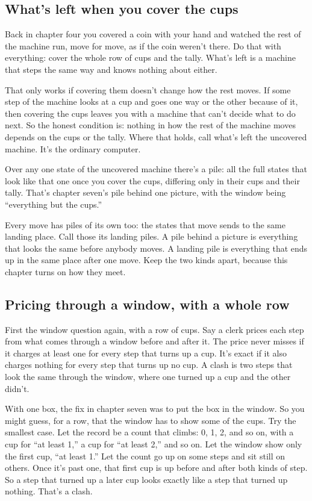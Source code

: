 \documentclass[11pt,twoside]{article}
\theoremstyle{thielethm}
\theoremstyle{thieledef}
\theoremstyle{thieledef}
\theoremstyle{thieledef}
\theoremstyle{thielethm}
\theoremstyle{thieleobs}
\theoremstyle{thielethm}
\begin{document}
\subsection{What's left when you cover the cups}

Back in chapter four you covered a coin with your hand and watched the rest of the machine run, move for move, as if the coin weren't there. Do that with everything: cover the whole row of cups and the tally. What's left is a machine that steps the same way and knows nothing about either.

That only works if covering them doesn't change how the rest moves. If some step of the machine looks at a cup and goes one way or the other because of it, then covering the cups leaves you with a machine that can't decide what to do next. So the honest condition is: nothing in how the rest of the machine moves depends on the cups or the tally. Where that holds, call what's left the uncovered machine. It's the ordinary computer.

Over any one state of the uncovered machine there's a pile: all the full states that look like that one once you cover the cups, differing only in their cups and their tally. That's chapter seven's pile behind one picture, with the window being ``everything but the cups.''

Every move has piles of its own too: the states that move sends to the same landing place. Call those its landing piles. A pile behind a picture is everything that looks the same before anybody moves. A landing pile is everything that ends up in the same place after one move. Keep the two kinds apart, because this chapter turns on how they meet.

\subsection{Pricing through a window, with a whole row}

First the window question again, with a row of cups. Say a clerk prices each step from what comes through a window before and after it. The price never misses if it charges at least one for every step that turns up a cup. It's exact if it also charges nothing for every step that turns up no cup. A clash is two steps that look the same through the window, where one turned up a cup and the other didn't.

With one box, the fix in chapter seven was to put the box in the window. So you might guess, for a row, that the window has to show some of the cups. Try the smallest case. Let the record be a count that climbs: 0, 1, 2, and so on, with a cup for ``at least 1,'' a cup for ``at least 2,'' and so on. Let the window show only the first cup, ``at least 1.'' Let the count go up on some steps and sit still on others. Once it's past one, that first cup is up before and after both kinds of step. So a step that turned up a later cup looks exactly like a step that turned up nothing. That's a clash.
\end{document}
